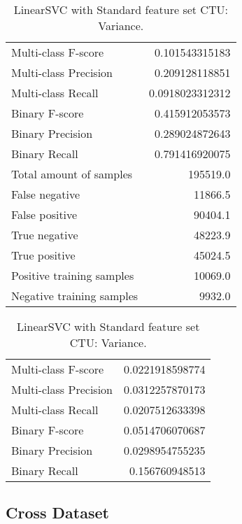 \begin{table}[H]
\begin{minipage}{0.5\textwidth}
\caption{LinearSVC with Standard feature set CTU: Average.}
\centering
\begin{tabular}{l r}
\toprule
Multi-class F-score & 0.101543315183 \\
Multi-class Precision & 0.209128118851 \\
Multi-class Recall & 0.0918023312312 \\
\midrule
Binary F-score & 0.415912053573 \\
Binary Precision & 0.289024872643 \\
Binary Recall & 0.791416920075 \\
\midrule
Total amount of samples & 195519.0 \\
False negative & 11866.5 \\
False positive & 90404.1 \\
True negative & 48223.9 \\
True positive & 45024.5 \\
\midrule
Positive training samples & 10069.0 \\
Negative training samples & 9932.0 \\
\bottomrule
\end{tabular}
\end{minipage}
\hfillx
\begin{minipage}{0.5\textwidth}
\caption{LinearSVC with Standard feature set CTU: Variance.}
\centering
\begin{tabular}{l r}
\toprule
Multi-class F-score & 0.0221918598774 \\
Multi-class Precision & 0.0312257870173 \\
Multi-class Recall & 0.0207512633398 \\
\midrule
Binary F-score & 0.0514706070687 \\
Binary Precision & 0.0298954755235 \\
Binary Recall & 0.156760948513 \\
\bottomrule
\end{tabular}
\end{minipage}
\end{table}

\newpage
\subsection{Cross Dataset}


